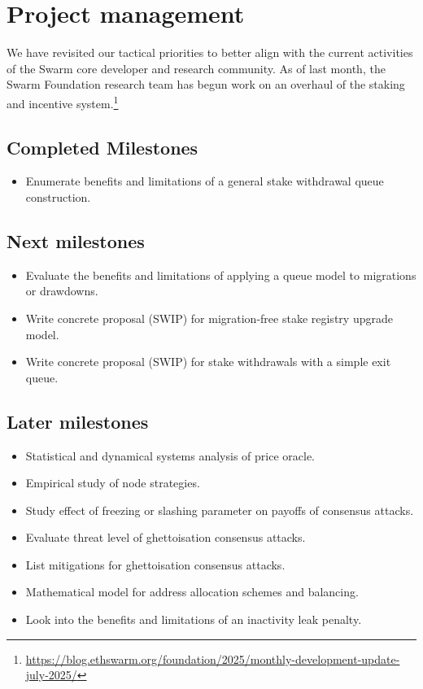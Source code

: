 \newpage
\section*{Project management}

We have revisited our tactical priorities to better align with the current activities of the Swarm core developer and research community.
%
As of last month, the Swarm Foundation research team has begun work on an overhaul of the staking and incentive system.\footnote{\url{https://blog.ethswarm.org/foundation/2025/monthly-development-update-july-2025/}}

\subsection*{Completed Milestones}

\begin{itemize}
  \item Enumerate benefits and limitations of a general stake withdrawal queue construction.

    
\end{itemize}

\subsection*{Next milestones}

\begin{itemize}
  \item Evaluate the benefits and limitations of applying a queue model to migrations or drawdowns.
  \item Write concrete proposal (SWIP) for migration-free stake registry upgrade model.
  \item Write concrete proposal (SWIP) for stake withdrawals with a simple exit queue.
\end{itemize}

\subsection*{Later milestones}
\begin{itemize}
  \item Statistical and dynamical systems analysis of price oracle.
  \item Empirical study of node strategies.
  \item Study effect of freezing or slashing parameter on payoffs of consensus attacks.
  \item Evaluate threat level of ghettoisation consensus attacks.
  \item List mitigations for ghettoisation consensus attacks.
  \item Mathematical model for address allocation schemes and balancing.
  \item Look into the benefits and limitations of an inactivity leak penalty.
\end{itemize}


